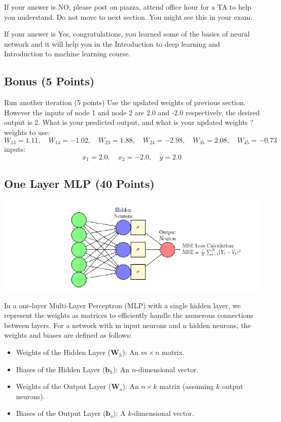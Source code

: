 \documentclass{article}
\begin{document}
If your answer is NO, please post on piazza, attend office hour for a TA to help you understand.
Do not move to next section. You might see this in your exam.


If your answer is Yes, congratulations, you learned some of the basics of neural network and it will help you
in the Introduction to deep learning and Introduction to machine learning course.

\subsection{Bonus (5 Points)}
Run another iteration (5 points) Use the updated weights of previous section. However the inputs of
node 1 and node 2 are 2.0 and -2.0 respectively, the desired output is 2. What is your predicted output, and
what is your updated weights ?
\\ weights to use:
\[
W_{13} = 1.11, \quad W_{14} = -1.02, \quad W_{23} = 1.88, \quad W_{24} = -2.98, \quad W_{35} = 2.08, \quad W_{45} = -0.73
\]
inputs:
\[
x_1 = 2.0, \quad x_2 = -2.0, \quad \hat{y} = 2.0
\]

\subsection{One Layer MLP (40 Points)}

\begin{center}
    \includegraphics[scale=0.5]{nn1.png}
\end{center}
In a one-layer Multi-Layer Perceptron (MLP) with a single hidden layer, we represent the weights as matrices
to efficiently handle the numerous connections between layers. For a network with m input neurons and n
hidden neurons, the weights and biases are defined as follows:
\begin{itemize}
    \item Weights of the Hidden Layer ($\mathbf{W}_h$): An $m \times n$ matrix.
    \item Biases of the Hidden Layer ($\mathbf{b}_h$): An $n$-dimensional vector.
    \item Weights of the Output Layer ($\mathbf{W}_o$): An $n \times k$ matrix (assuming $k$ output neurons).
    \item Biases of the Output Layer ($\mathbf{b}_o$): A $k$-dimensional vector.
\end{itemize}
\end{document}
